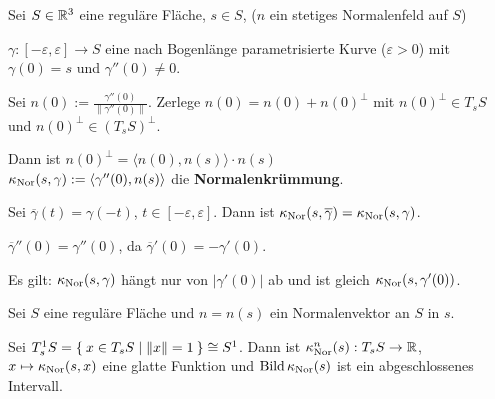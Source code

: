 \begin{definition}%
    Sei $S \in \mathbb{R}^3$ eine reguläre Fläche, $s \in S$, ($n$ ein
    stetiges Normalenfeld auf $S$)

    $\gamma:[-\varepsilon, \varepsilon] \rightarrow S$ eine nach
    Bogenlänge parametrisierte Kurve ($\varepsilon > 0$) mit
    $\gamma(0) = s$ und $\gamma''(0) \neq 0$.

    Sei $n(0) := \frac{\gamma''(0)}{\|\gamma''(0)\|}$. Zerlege
    $n(0) = n(0) + n(0)^\bot$ mit $n(0)^\bot \in T_s S$ und
    $n(0)^\bot \in (T_s S)^\bot$.

    Dann ist $n(0)^\bot = \langle n(0), n(s) \rangle \cdot n(s)$\\
    $\kappa_{\textnormal{Nor}}(s, \gamma) := \langle \gamma''(0), n(s) \rangle$
    die \textbf{Normalenkrümmung}.
\end{definition}

\begin{bemerkung}
    Sei $\overline{\gamma}(t) = \gamma(-t)$, $t \in [- \varepsilon, \varepsilon]$.
    Dann ist $\kappa_{\textnormal{Nor}}(s, \overline{\gamma}) = \kappa_{\textnormal{Nor}}(s, \gamma)$.
\end{bemerkung}

\begin{beweis}
    $\overline{\gamma}''(0) = \gamma''(0)$, da $\overline{\gamma}'(0) = - \gamma'(0)$.

    Es gilt: $\kappa_{\textnormal{Nor}}(s,\gamma)$ hängt nur von $|\gamma'(0)|$ ab
    und ist gleich $\kappa_{\textnormal{Nor}}(s, \gamma'(0))$.
\end{beweis}

\begin{bemerkung}%
    Sei $S$ eine reguläre Fläche und $n=n(s)$ ein Normalenvektor an 
    $S$ in $s$.

    Sei $T_{s}^{1} S = \Set{x \in T_s S | \|x\| = 1} \cong S^1$.
    Dann ist $\kappa_{\textnormal{Nor}}^n(s): T_s S \rightarrow \mathbb{R}$,
    $x \mapsto \kappa_{\textnormal{Nor}}(s,x)$ eine glatte Funktion und 
    $\operatorname{Bild} \kappa_{\textnormal{Nor}}(s)$ ist ein abgeschlossenes Intervall.
\end{bemerkung}

